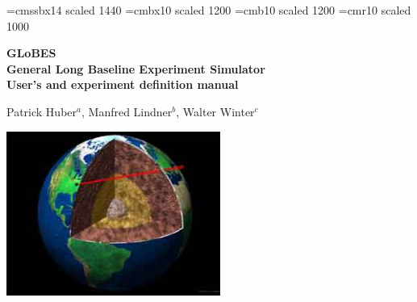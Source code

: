 \documentclass[a4paper,12pt,twoside]{book}
\newcommand{\GLOBES}{{\sf GLoBES}}
\begin{document}
 

\frontmatter
{}
\thispagestyle{empty}
{
\setlength{\parindent}{0cm}


\font\fa=cmssbx14 scaled 1440
\font\fb=cmbx10 scaled 1200
\font\fc=cmb10 scaled 1200
\font\fd=cmr10 scaled 1000  

{\setlength{\baselineskip}{1.2cm}}

\vspace*{1.5cm}

\begin{center}
{ \Large \bf
{\Huge \GLOBES} \\
General Long Baseline Experiment Simulator \\ }
\vspace*{0.5cm}
{\large \bf User's and experiment definition manual }

\end{center}

\vspace{0.5cm}

\begin{center}
{\large Patrick Huber$^a$, Manfred Lindner$^b$, Walter Winter$^c$}
\end{center}

\vspace{0.3cm}

\begin{center}





\end{center}

\vspace{1cm}

\begin{center}
\colorbox{black}{\includegraphics[width=7cm]{earthint}}


\end{center}}
\end{document}
